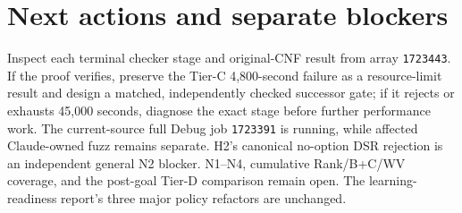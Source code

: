 \documentclass[10pt]{article}
\begin{document}
\section*{Next actions and separate blockers}
Inspect each terminal checker stage and original-CNF result from array
\texttt{1723443}. If the proof verifies, preserve the Tier-C 4,800-second
failure as a resource-limit result and design a matched, independently
checked successor gate; if it rejects or exhausts 45,000 seconds, diagnose
the exact stage before further performance work. The current-source full
Debug job \texttt{1723391} is running, while affected Claude-owned fuzz
remains separate. H2's canonical no-option DSR rejection is an independent
general N2 blocker. N1--N4, cumulative Rank/B+C/WV coverage, and the
post-goal Tier-D comparison remain open. The learning-readiness report's
three major policy refactors are unchanged.
\end{document}
